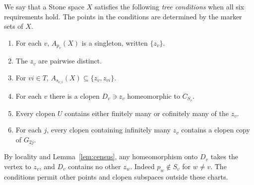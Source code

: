 \documentclass[11pt,letterpaper]{article}
\theoremstyle{definition}\newtheorem{definition}[theorem]{Definition}
\begin{document}
We say that a Stone space \(X\) satisfies the following \emph{tree
conditions} when all six requirements hold. The points in the conditions
are determined by the marker sets of \(X\).
\begin{enumerate}
\item For each \(v\), \(A_{p_v}(X)\) is a singleton, written \(\{z_v\}\).
\item The \(z_v\) are pairwise distinct.
\item For \(vi\in T\), \(A_{s_{v,i}}(X)\subseteq\{z_v,z_{vi}\}\).
\item For each \(v\) there is a clopen \(D_v\ni z_v\) homeomorphic to
\(C_{S_v}\).
\item Every clopen \(U\) contains either finitely many or cofinitely many
of the \(z_v\).
\item For each \(j\), every clopen containing infinitely many \(z_v\)
contains a clopen copy of \(G_{2j}\).
\end{enumerate}
By locality and Lemma~\ref{lem:census}, any homeomorphism onto \(D_v\)
takes the vertex to \(z_v\), and \(D_v\) contains no other \(z_w\).
Indeed \(p_w\notin S_v\) for \(w\ne v\). The conditions permit other
points and clopen subspaces outside these charts.
\end{document}
